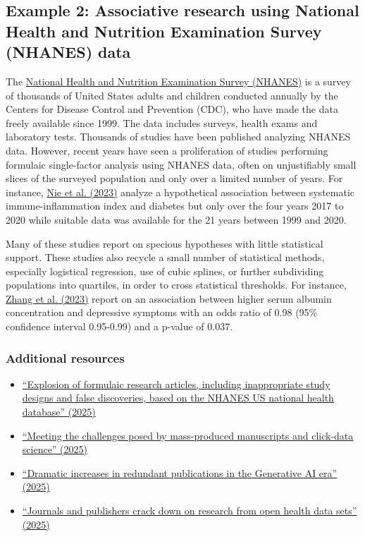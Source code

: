 \documentclass[letterpaper, 12pt]{article}
\begin{document}
\subsection*{Example 2: Associative research using National Health and Nutrition Examination Survey (NHANES) data}

The \href{https://www.cdc.gov/nchs/nhanes/index.html}{National Health and Nutrition Examination Survey (NHANES)} is a survey of thousands of United States adults and children conducted annually by the Centers for Disease Control and Prevention (CDC), who have made the data freely available since 1999. The data includes surveys, health exams and laboratory tests. Thousands of studies have been published analyzing NHANES data. However, recent years have seen a proliferation of studies performing formulaic single-factor analysis using NHANES data, often on unjustifiably small slices of the surveyed population and only over a limited number of years. For instance, \href{https://doi.org/10.3389/fendo.2023.1245199}{Nie et al. (2023)} analyze a hypothetical association between systematic immune-inflammation index and diabetes but only over the four years 2017 to 2020 while suitable data was available for the 21 years between 1999 and 2020.

Many of these studies report on specious hypotheses with little statistical support. These studies also recycle a small number of statistical methods, especially logistical regression, use of cubic splines, or further subdividing populations into quartiles, in order to cross statistical thresholds. For instance, \href{https://doi.org/10.1186/s12888-023-04935-1}{Zhang et al. (2023)} report on an association between higher serum albumin concentration and depressive symptoms with an odds ratio of 0.98 (95\% confidence interval 0.95-0.99) and a p-value of 0.037.

\subsubsection*{Additional resources}

\begin{itemize}
    \setlength\itemsep{-0.5em}
    \item \href{https://doi.org/10.1371/journal.pbio.3003152}{``Explosion of formulaic research articles, including inappropriate study designs and false discoveries, based on the NHANES US national health database'' (2025)}
    \item \href{https://doi.org/10.3897/ese.2025.e165043}{``Meeting the challenges posed by mass-produced manuscripts and click-data science'' (2025)}
    \item \href{https://doi.org/10.1101/2025.09.09.25335401}{``Dramatic increases in redundant publications in the Generative AI era'' (2025)}
    \item \href{https://doi.org/10.1126/science.z6eukgo}{``Journals and publishers crack down on research from open health data sets'' (2025)}
\end{itemize}
\end{document}
